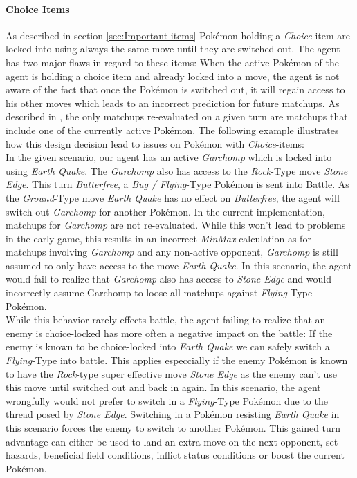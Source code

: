 \paragraph{Choice Items}
As described in section \ref{sec:Important-items} Pokémon holding a \textit{Choice}-item are locked into using always 
the same move until they are switched out. The agent has two major flaws in regard to these items: When the active
Pokémon of the agent is holding a choice item and already locked into a move, the agent is not aware of the fact that
once the Pokémon is switched out, it will regain access to his other moves which leads to an incorrect prediction
for future matchups. As described in , the only matchups re-evaluated
on a given turn are matchups that include one of the currently active Pokémon. The following example illustrates how
this design decision lead to issues on Pokémon with \textit{Choice}-items: \\
In the given scenario, our agent has an active \textit{Garchomp} which is locked into using \textit{Earth Quake}. The 
\textit{Garchomp} also has access to the \textit{Rock}-Type move \textit{Stone Edge}. This turn \textit{Butterfree},
a \textit{Bug / Flying}-Type Pokémon
is sent into Battle. As the \textit{Ground}-Type move \textit{Earth Quake} has no effect on \textit{Butterfree}, the agent will
switch out \textit{Garchomp} for another Pokémon. In the current implementation, matchups for \textit{Garchomp} are not
re-evaluated. While this won't lead to problems in the early game, this results in an incorrect \textit{MinMax} calculation
as for matchups involving \textit{Garchomp} and any non-active opponent, \textit{Garchomp} is still assumed to only have
access to the move \textit{Earth Quake}. In this scenario, the agent would fail to realize that \textit{Garchomp} also
has access to \textit{Stone Edge} and would incorrectly assume Garchomp to loose all matchups against \textit{Flying}-Type
Pokémon. \\
While this behavior rarely effects battle, the agent failing to realize that an enemy is choice-locked has more often a 
negative impact on the battle: If the enemy is known to be choice-locked into \textit{Earth Quake} we can safely switch 
a \textit{Flying}-Type into battle. This applies especcially if the enemy Pokémon is known to have the \textit{Rock}-type 
super effective
move \textit{Stone Edge} as the enemy can't use this move until switched out and back in again. In this scenario, the
agent wrongfully would not prefer to switch in a \textit{Flying}-Type Pokémon due to the thread posed by 
\textit{Stone Edge}. Switching in a Pokémon resisting \textit{Earth Quake} in this scenario forces the enemy to switch
to another Pokémon. This gained turn advantage can either be used to land an extra move on the next opponent, set hazards,
beneficial field conditions, inflict status conditions or boost the current Pokémon.

